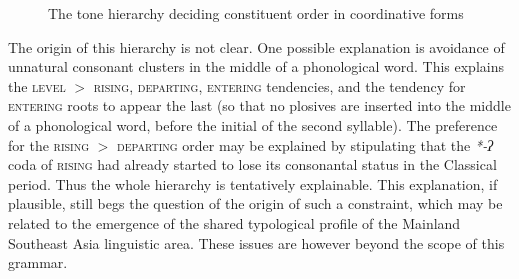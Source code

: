 \documentclass[UTF8, a4paper, oneside, scheme=plain, 12pt]{ctexrep}
\newcommand*{\textgt}{$>$ }
\newcommand{\form}[1]{\emph{#1}}
\newcommand*{\category}[1]{\textsc{#1}}
\begin{document}
\begin{figure}[H]
    \centering
    \caption{The tone hierarchy deciding constituent order in coordinative forms}
    \label{fig:coordination-tone-hierarchy}
\end{figure}


The origin of this hierarchy is not clear.
One possible explanation is avoidance of unnatural consonant clusters in the middle of a phonological word.
This explains the \category{level} \textgt \category{rising}, \category{departing}, \category{entering} tendencies,
and the tendency for \category{entering} roots to appear the last (so that no plosives are inserted into the middle of a phonological word, before the initial of the second syllable).
The preference for the \category{rising} \textgt \category{departing} order may be explained by stipulating that the \form{*-ʔ} coda of \category{rising} had already started to lose its consonantal status in the Classical period.
Thus the whole hierarchy is tentatively explainable.
This explanation, if plausible, still begs the question of the origin of such a constraint, which may be related to the emergence of the shared typological profile of the Mainland Southeast Asia linguistic area.
These issues are however beyond the scope of this grammar.
\end{document}
